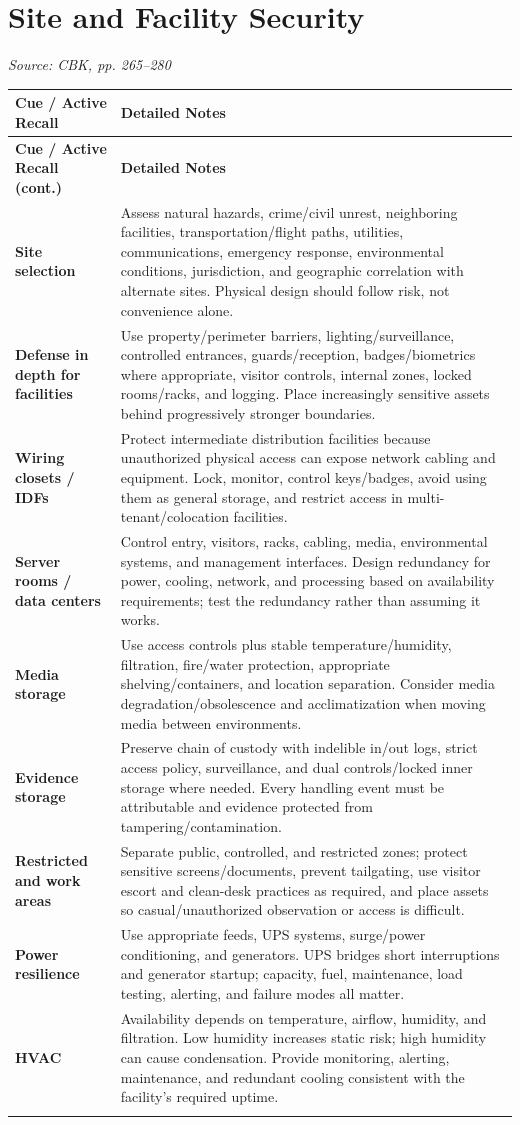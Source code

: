 \documentclass[10pt,letterpaper]{article}
\makeatletter
\newenvironment{cornell}{\rowcolors{2}{white}{notebg}\begin{longtable}{@{}>{\raggedright\arraybackslash\columncolor{cuebg}\color{navy}\bfseries}p{0.285\textwidth}>{\raggedright\arraybackslash}p{0.65\textwidth}@{}}
\rowcolor{navy}\color{white}\textbf{Cue / Active Recall} & \color{white}\textbf{Detailed Notes}\\ \hline\endfirsthead
\rowcolor{navy}\color{white}\textbf{Cue / Active Recall (cont.)} & \color{white}\textbf{Detailed Notes}\\ \hline\endhead}{\end{longtable}}
\newcommand{\noterow}[2]{#1 & #2\\\arrayrulecolor{line}\hline}
\newcommand{\source}[1]{\par{\footnotesize\color{teal}\textit{Source: CBK, #1}}\par}
\makeatother
\begin{document}
\section{\color{navy}Site and Facility Security}
\source{pp. 265--280}
\begin{cornell}
\noterow{Site selection}{Assess natural hazards, crime/civil unrest, neighboring facilities, transportation/flight paths, utilities, communications, emergency response, environmental conditions, jurisdiction, and geographic correlation with alternate sites. Physical design should follow risk, not convenience alone.}
\noterow{Defense in depth for facilities}{Use property/perimeter barriers, lighting/surveillance, controlled entrances, guards/reception, badges/biometrics where appropriate, visitor controls, internal zones, locked rooms/racks, and logging. Place increasingly sensitive assets behind progressively stronger boundaries.}
\noterow{Wiring closets / IDFs}{Protect intermediate distribution facilities because unauthorized physical access can expose network cabling and equipment. Lock, monitor, control keys/badges, avoid using them as general storage, and restrict access in multi-tenant/colocation facilities.}
\noterow{Server rooms / data centers}{Control entry, visitors, racks, cabling, media, environmental systems, and management interfaces. Design redundancy for power, cooling, network, and processing based on availability requirements; test the redundancy rather than assuming it works.}
\noterow{Media storage}{Use access controls plus stable temperature/humidity, filtration, fire/water protection, appropriate shelving/containers, and location separation. Consider media degradation/obsolescence and acclimatization when moving media between environments.}
\noterow{Evidence storage}{Preserve chain of custody with indelible in/out logs, strict access policy, surveillance, and dual controls/locked inner storage where needed. Every handling event must be attributable and evidence protected from tampering/contamination.}
\noterow{Restricted and work areas}{Separate public, controlled, and restricted zones; protect sensitive screens/documents, prevent tailgating, use visitor escort and clean-desk practices as required, and place assets so casual/unauthorized observation or access is difficult.}
\noterow{Power resilience}{Use appropriate feeds, UPS systems, surge/power conditioning, and generators. UPS bridges short interruptions and generator startup; capacity, fuel, maintenance, load testing, alerting, and failure modes all matter.}
\noterow{HVAC}{Availability depends on temperature, airflow, humidity, and filtration. Low humidity increases static risk; high humidity can cause condensation. Provide monitoring, alerting, maintenance, and redundant cooling consistent with the facility's required uptime.}

\end{cornell}
\end{document}
